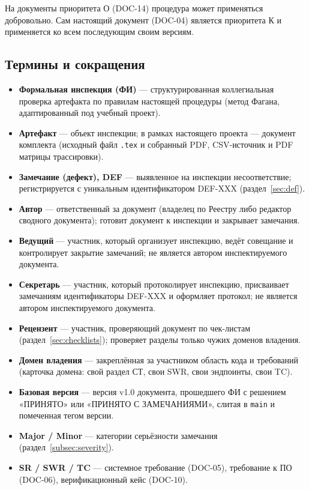 \documentclass[12pt,a4paper]{article}
\begin{document}
На документы приоритета О (DOC-14) процедура может применяться добровольно.
Сам настоящий документ (DOC-04) является приоритета К и применяется ко всем
последующим своим версиям.

\subsection{Термины и сокращения}

\begin{itemize}
  \item \textbf{Формальная инспекция (ФИ)} --- структурированная коллегиальная
        проверка артефакта по правилам настоящей процедуры (метод Фагана,
        адаптированный под учебный проект).
  \item \textbf{Артефакт} --- объект инспекции; в рамках настоящего проекта ---
        документ комплекта (исходный файл \texttt{.tex} и собранный PDF,
        CSV-источник и PDF матрицы трассировки).
  \item \textbf{Замечание (дефект), DEF} --- выявленное на инспекции
        несоответствие; регистрируется с уникальным идентификатором DEF-XXX
        (раздел~\ref{sec:def}).
  \item \textbf{Автор} --- ответственный за документ (владелец по Реестру либо
        редактор сводного документа); готовит документ к инспекции и закрывает
        замечания.
  \item \textbf{Ведущий} --- участник, который организует инспекцию, ведёт
        совещание и контролирует закрытие замечаний; не является автором
        инспектируемого документа.
  \item \textbf{Секретарь} --- участник, который протоколирует инспекцию,
        присваивает замечаниям идентификаторы DEF-XXX и оформляет протокол;
        не является автором инспектируемого документа.
  \item \textbf{Рецензент} --- участник, проверяющий документ по чек-листам
        (раздел~\ref{sec:checklists}); проверяет разделы только чужих доменов
        владения.
  \item \textbf{Домен владения} --- закреплённая за участником область кода и
        требований (карточка домена: свой раздел СТ, свои SWR, свои эндпоинты,
        свои TC).
  \item \textbf{Базовая версия} --- версия v1.0 документа, прошедшего ФИ с
        решением «ПРИНЯТО» или «ПРИНЯТО С ЗАМЕЧАНИЯМИ», слитая в \texttt{main}
        и помеченная тегом версии.
  \item \textbf{Major / Minor} --- категории серьёзности замечания
        (раздел~\ref{subsec:severity}).
  \item \textbf{SR / SWR / TC} --- системное требование (DOC-05), требование к
        ПО (DOC-06), верификационный кейс (DOC-10).
\end{itemize}
\end{document}
